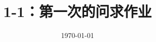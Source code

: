 


\documentclass[11pt, a4paper, UTF8]{ctexart}


\title{1-1：第一次的问求作业}
\date{\today}


\maketitle
\noplagiarism

\beginthishw
\begin{problem}[书本：题目]
	题目好长好长 \\
	The problem is so looooooooooooooooooooooooooong
\end{problem}

%


